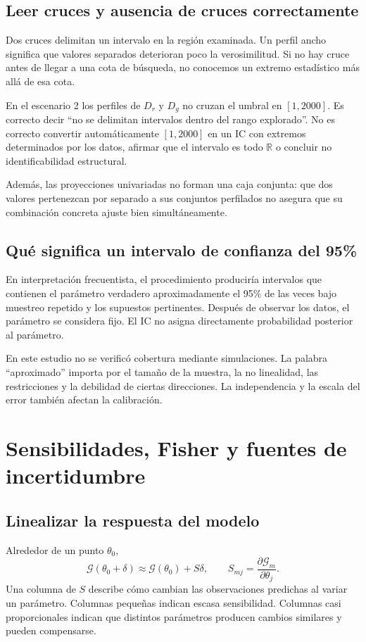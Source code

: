 \documentclass[11pt,a4paper]{report}
\newcommand{\R}{\mathbb R}
\begin{document}
\section{Leer cruces y ausencia de cruces correctamente}
Dos cruces delimitan un intervalo en la región examinada. Un perfil ancho significa que valores separados deterioran poco la verosimilitud. Si no hay cruce antes de llegar a una cota de búsqueda, no conocemos un extremo estadístico más allá de esa cota.

En el escenario 2 los perfiles de $D_r$ y $D_g$ no cruzan el umbral en $[1,2000]$. Es correcto decir ``no se delimitan intervalos dentro del rango explorado''. No es correcto convertir automáticamente $[1,2000]$ en un IC con extremos determinados por los datos, afirmar que el intervalo es todo $\R$ o concluir no identificabilidad estructural.

Además, las proyecciones univariadas no forman una caja conjunta: que dos valores pertenezcan por separado a sus conjuntos perfilados no asegura que su combinación concreta ajuste bien simultáneamente.

\section{Qué significa un intervalo de confianza del 95\%}
En interpretación frecuentista, el procedimiento produciría intervalos que contienen el parámetro verdadero aproximadamente el 95\% de las veces bajo muestreo repetido y los supuestos pertinentes. Después de observar los datos, el parámetro se considera fijo. El IC no asigna directamente probabilidad posterior al parámetro.

En este estudio no se verificó cobertura mediante simulaciones. La palabra ``aproximado'' importa por el tamaño de la muestra, la no linealidad, las restricciones y la debilidad de ciertas direcciones. La independencia y la escala del error también afectan la calibración.



\chapter{Sensibilidades, Fisher y fuentes de incertidumbre}
\section{Linealizar la respuesta del modelo}
Alrededor de un punto $\theta_0$,
\[
\mathcal G(\theta_0+\delta)\approx\mathcal G(\theta_0)+S\delta,
\qquad S_{mj}=\frac{\partial\mathcal G_m}{\partial\theta_j}.
\]
Una columna de $S$ describe cómo cambian las observaciones predichas al variar un parámetro. Columnas pequeñas indican escasa sensibilidad. Columnas casi proporcionales indican que distintos parámetros producen cambios similares y pueden compensarse.
\end{document}
